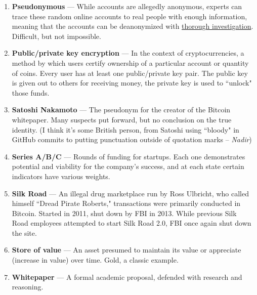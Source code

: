 \documentclass[11pt]{article}
\begin{document}
\begin{enumerate}
        \item \textbf{Pseudonymous} --- While accounts are allegedly anonymous, experts can trace these random online accounts to real people with enough information, meaning that the accounts can be deanonymized with \underline{thorough investigation}. Difficult, but not impossible.
        
        \newpage %
        
        \item \textbf{Public/private key encryption} --- In the context of cryptocurrencies, a method by which users certify ownership of a particular account or quantity of coins. Every user has at least one public/private key pair. The public key is given out to others for receiving money, the private key is used to ``unlock" those funds.
        
        \item \textbf{Satoshi Nakamoto} --- The pseudonym for the creator of the Bitcoin whitepaper. Many suspects put forward, but no conclusion on the true identity. (I think it's some British person, from Satoshi using ``bloody" in GitHub commits to putting punctuation outside of quotation marks -- \textit{Nadir})
        
        \item \textbf{Series A/B/C} --- Rounds of funding for startups. Each one demonstrates potential and viability for the company's success, and at each state certain indicators have various weights.
        
        \item \textbf{Silk Road} --- An illegal drug marketplace run by Ross Ulbricht, who called himself ``Dread Pirate Roberts," transactions were primarily conducted in Bitcoin. Started in 2011, shut down by FBI in 2013. While previous Silk Road employees attempted to start Silk Road 2.0, FBI once again shut down the site.
        
        \item \textbf{Store of value} --- An asset presumed to maintain its value or appreciate (increase in value) over time. Gold, a classic example.
        
        \item \textbf{Whitepaper} --- A formal academic proposal, defended with research and reasoning.
    \end{enumerate}
\end{document}
